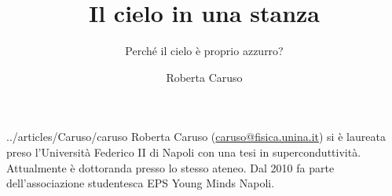 ﻿\title{Il cielo in una stanza}
\subtitle{Perché il cielo è proprio azzurro?}
\suptitle{\phantom{x}}
\author{Roberta Caruso}
\maketitle
\begin{small}
\pichskip{4mm}
\nobalance



\vfill
\begin{thebiography}{../articles/Caruso/caruso}
Roberta Caruso (\url{caruso@fisica.unina.it}) si è laureata preso l'Università Federico II di Napoli con una tesi in superconduttività.
Attualmente è dottoranda presso lo stesso ateneo. Dal 2010 fa parte dell'associazione studentesca EPS Young Minds Napoli.
\end{thebiography}
\end{small}

